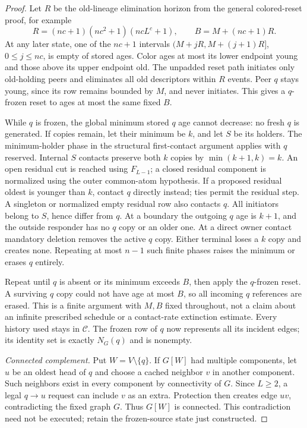 \documentclass[11pt]{article}
\begin{document}
\begin{proof}
Let $R$ be the old-lineage elimination horizon from the general
colored-reset proof, for example
\[
 R=(nc+1)(nc^2+1)(ncL^c+1),\qquad B=M+(nc+1)R.
\]
At any later state, one of the $nc+1$ intervals
$(M+jR,M+(j+1)R]$, $0\le j\le nc$, is empty of stored ages.
Color ages at most its lower endpoint young and those above
its upper endpoint old. The unpadded reset path initiates only
old-holding peers and eliminates all old descriptors within $R$
events. Peer $q$ stays young, since its row remains bounded by
$M$, and never initiates. This gives a $q$-frozen reset to ages
at most the same fixed $B$.

While $q$ is frozen, the global minimum stored $q$ age cannot
decrease: no fresh $q$ is generated. If copies remain, let their
minimum be $k$, and let $S$ be its holders. The minimum-holder
phase in the structural first-contact argument applies with
$q$ reserved. Internal $S$ contacts preserve both $k$ copies by
$\min(k+1,k)=k$. An open residual cut is reached using $F_{L-1}$;
a closed residual component is normalized using the outer
common-atom hypothesis. If a proposed residual oldest is younger
than $k$, contact $q$ directly instead; ties permit the residual
step. A singleton or normalized empty residual row also contacts
$q$. All initiators belong to $S$, hence differ from $q$.
At a boundary the outgoing $q$ age is $k+1$, and the outside
responder has no $q$ copy or an older one. At a direct owner
contact mandatory deletion removes the active $q$ copy.
Either terminal loses a $k$ copy and creates none. Repeating
at most $n-1$ such finite phases raises the minimum or erases
$q$ entirely.

Repeat until $q$ is absent or its minimum exceeds $B$, then
apply the $q$-frozen reset. A surviving $q$ copy could not have
age at most $B$, so all incoming $q$ references are erased.
This is a finite argument with $M,B$ fixed throughout, not a
claim about an infinite prescribed schedule or a contact-rate
extinction estimate. Every history used stays in $\mathcal C$.
The frozen row of $q$ now represents all its incident edges;
its identity set is exactly $N_G(q)$ and is nonempty.

\emph{Connected complement.}
Put $W=V\setminus\{q\}$. If $G[W]$ had multiple components,
let $u$ be an oldest head of $q$ and choose a cached neighbor
$v$ in another component. Such neighbors exist in every
component by connectivity of $G$. Since $L\ge2$, a legal
$q\to u$ request can include $v$ as an extra. Protection then
creates edge $uv$, contradicting the fixed graph $G$.
Thus $G[W]$ is connected. This contradiction need not be executed;
retain the frozen-source state just constructed.


\end{proof}
\end{document}
